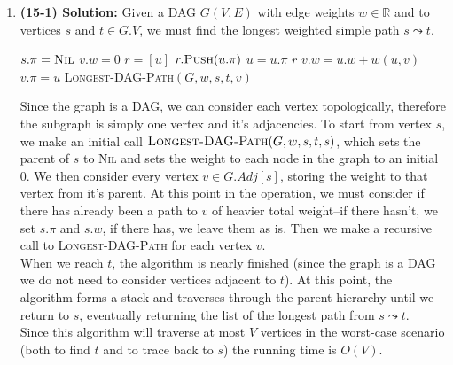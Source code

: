 \documentclass{article}
\begin{document}
\begin{enumerate}
    \item \textbf{(15-1) Solution:} 
    Given a DAG $G(V,E)$ with edge weights $w \in \mathbb{R}$ and to vertices $s$ and $t \in G.V$, we must find the longest weighted simple path $s \leadsto t$. 
    \begin{algorithm}[H]
    \caption{}
    \begin{algorithmic}
            \STATE $s.\pi = \textsc{Nil}$
                \STATE $v.w = 0$
            \ENDFOR
            \STATE $r = [u]$
                \STATE $r.\textsc{Push}(u.\pi)$
                \STATE $u = u.\pi$
            \ENDWHILE
            \RETURN $r$
        \ENDIF
                \STATE $v.w = u.w + w(u,v)$
                \STATE $v.\pi = u$
            \ENDIF
            \STATE \textsc{Longest-DAG-Path}$(G, w, s, t, v)$
        \ENDFOR
    \end{algorithmic}
    \end{algorithm}
    Since the graph is a DAG, we can consider each vertex topologically, therefore the subgraph is simply one vertex and it's adjacencies. To start from vertex $s$, we make an initial call $\textsc{Longest-DAG-Path}(G, w, s, t, s)$, which sets the parent of $s$ to \textsc{Nil} and sets the weight to each node in the graph to an initial $0$.  We then consider every vertex $v \in G.Adj[s]$, storing the weight to that vertex from it's parent. At this point in the operation, we must consider if there has already been a path to $v$ of heavier total weight--if there hasn't, we set $s.\pi$ and $s.w$, if there has, we leave them as is. Then we make a recursive call to \textsc{Longest-DAG-Path} for each vertex $v$.\\
    When we reach $t$, the algorithm is nearly finished (since the graph is a DAG we do not need to consider vertices adjacent to $t$). At this point, the algorithm forms a stack and traverses through the parent hierarchy until we return to $s$, eventually returning the list of the longest path from $s \leadsto t$.\\
    Since this algorithm will traverse at most $V$ vertices in the worst-case scenario (both to find $t$ and to trace back to $s$) the running time is $O(V)$.
    \end{enumerate}
\end{document}
